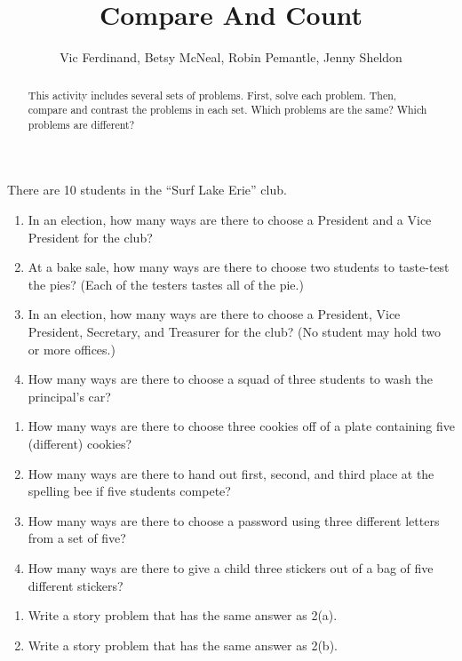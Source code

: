 \documentclass{ximera}
\title{Compare And Count}
\author{Vic Ferdinand, Betsy McNeal, Robin Pemantle, Jenny Sheldon}
\begin{document}
\begin{abstract}
This activity includes several sets of problems.  First, solve each problem.  Then, compare and contrast the problems in each set.  Which problems are the same?  Which problems are different?
\end{abstract}
\maketitle



\begin{problem}
There are 10 students in the ``Surf Lake Erie'' club.
\begin{enumerate}
\item In an election, how many ways are there to choose a President and a Vice President for the club?
\item At a bake sale, how many ways are there to choose two students to taste-test the pies? (Each of the testers tastes all of the pie.)
\item In an election, how many ways are there to choose a President, Vice President, Secretary, and Treasurer for the club?  (No student may hold two or more offices.)
\item How many ways are there to choose a squad of three students to wash the principal's car?

\end{enumerate}
\end{problem}

\begin{problem}
\begin{enumerate}
\item How many ways are there to choose three cookies off of a plate containing five (different) cookies?
\item How many ways are there to hand out first, second, and third place at the spelling bee if five students compete?
\item How many ways are there to choose a password using three different letters from a set of five?
\item How many ways are there to give a child three stickers out of a bag of five different stickers?
\end{enumerate}
\end{problem}


\begin{problem}
\begin{enumerate}
\item Write a story problem that has the same answer as 2(a).
\item Write a story problem that has the same answer as 2(b).
\end{enumerate}
\end{problem}
\end{document}
